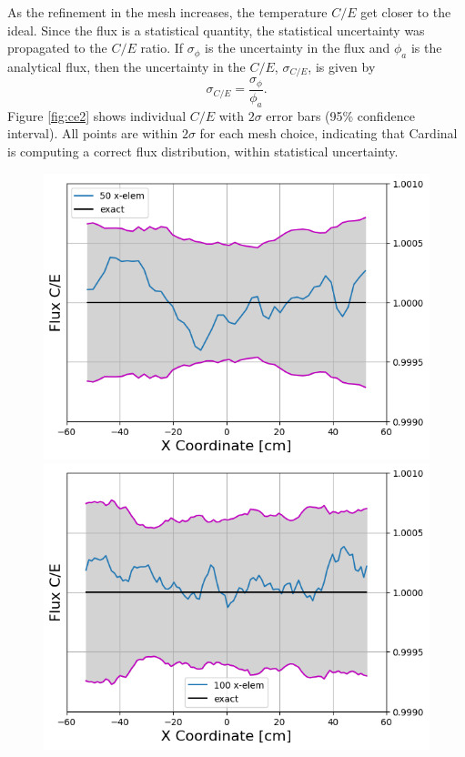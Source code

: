 \documentclass[letterpaper]{mc2023}
\begin{document}
As the refinement in the mesh increases, the temperature $C/E$ get closer to the ideal. Since the flux is a statistical quantity, the statistical
uncertainty was propagated to the $C/E$ ratio. If $\sigma_{\phi}$ is the uncertainty in the flux and  $\phi_{a}$ is the analytical flux, then
the uncertainty in the $C/E$, $\sigma_{C/E}$, is given by
\begin{equation}\label{eq:err_prop_r}
    \sigma_{C/E} = \frac{\sigma_{\phi}}{\phi_{a}}.
\end{equation}
Figure \ref{fig:ce2} shows individual $C/E$ with $2\sigma$ error bars (95\% confidence interval). All points are within $2\sigma$ for each mesh choice, indicating that Cardinal is computing
a correct flux distribution, within statistical uncertainty. 

\begin{figure}[H]
    \centering
    \begin{minipage}[b]{0.48\linewidth}
        \includegraphics[width=\linewidth]{figures/50_flux_CE_error_bars.png}
    \end{minipage}
    \begin{minipage}[b]{0.48\linewidth}
        \includegraphics[width=\linewidth]{figures/100_flux_CE_error_bars.png}

\end{minipage}
\end{figure}
\end{document}
